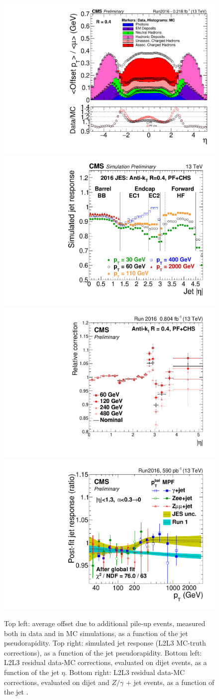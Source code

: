 \begin{figure}[!htb]
  \centering
    \includegraphics[width=.5\textwidth]{figures/JetPlots/stack2016.pdf}%
    \includegraphics[width=.5\textwidth]{figures/JetPlots/CMSresponse_ak4pfchs_L1FastL2L3.pdf}
\\
    \includegraphics[width=.5\textwidth]{figures/JetPlots/L2Res_logpt_MPF_kFSRfit_AK4PFchs_pythia8_2016.pdf}%
    \includegraphics[width=.5\textwidth]{figures/JetPlots/globalFitL3res_shifted_2016.pdf}

  \caption{Top left: average \pt offset due to additional pile-up events, measured both in data and in MC simulations, as a function of the jet pseudorapidity. Top right: simulated jet response (L2L3 MC-truth corrections), as a function of the jet pseudorapidity. Bottom left: L2L3 residual data-MC corrections, evaluated on dijet events, as a function of the jet $\eta$. Bottom right: L2L3 residual data-MC corrections, evaluated on dijet and $Z/\gamma$ + jet events, as a function of the jet \pt.}
  \label{fig:plot_JEC}
\end{figure}

